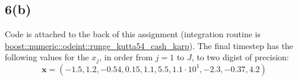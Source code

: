 \documentclass[11pt]{article}
\begin{document}
\subsection*{6(b)} Code is attached to the back of this assignment (integration routine is \url{boost::numeric::odeint::runge_kutta54_cash_karp}). The final timestep has the following values for the $x_j$, in order from $j=1$ to $J$, to two digist of precision:\\
\[ \mathbf{x} = (-1.5, 1.2, -0.54, 0.15, 1.1, 5.5, 1.1\cdot 10^1, -2.3, -0.37, 4.2) \]
\end{document}
